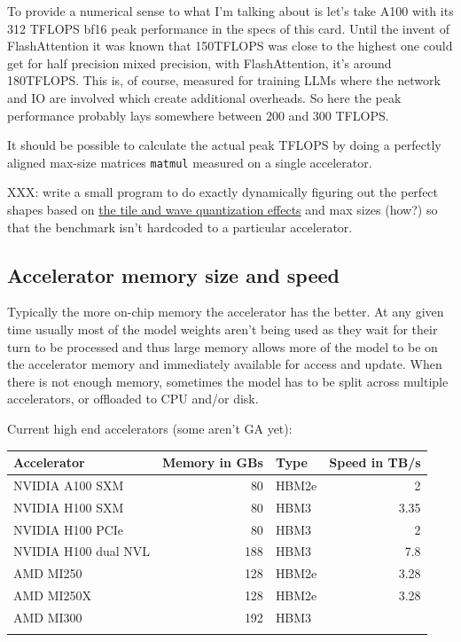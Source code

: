 \documentclass[
]{report}
\begin{document}
To provide a numerical sense to what I'm talking about is let's take
A100 with its 312 TFLOPS bf16 peak performance in the specs of this
card. Until the invent of FlashAttention it was known that 150TFLOPS was
close to the highest one could get for half precision mixed precision,
with FlashAttention, it's around 180TFLOPS. This is, of course, measured
for training LLMs where the network and IO are involved which create
additional overheads. So here the peak performance probably lays
somewhere between 200 and 300 TFLOPS.

It should be possible to calculate the actual peak TFLOPS by doing a
perfectly aligned max-size matrices \texttt{matmul} measured on a single
accelerator.

XXX: write a small program to do exactly dynamically figuring out the
perfect shapes based on
\href{https://docs.nvidia.com/deeplearning/performance/dl-performance-matrix-multiplication/index.html\#dim-quantization}{the
tile and wave quantization effects} and max sizes (how?) so that the
benchmark isn't hardcoded to a particular accelerator.

\subsection{Accelerator memory size and
speed}\label{accelerator-memory-size-and-speed}

Typically the more on-chip memory the accelerator has the better. At any
given time usually most of the model weights aren't being used as they
wait for their turn to be processed and thus large memory allows more of
the model to be on the accelerator memory and immediately available for
access and update. When there is not enough memory, sometimes the model
has to be split across multiple accelerators, or offloaded to CPU and/or
disk.

Current high end accelerators (some aren't GA yet):

\begin{longtable}[]{@{}lrlr@{}}
\toprule\noalign{}
Accelerator & Memory in GBs & Type & Speed in TB/s \\
\midrule\noalign{}
\endhead
\bottomrule\noalign{}
\endlastfoot
NVIDIA A100 SXM & 80 & HBM2e & 2 \\
NVIDIA H100 SXM & 80 & HBM3 & 3.35 \\
NVIDIA H100 PCIe & 80 & HBM3 & 2 \\
NVIDIA H100 dual NVL & 188 & HBM3 & 7.8 \\
AMD MI250 & 128 & HBM2e & 3.28 \\
AMD MI250X & 128 & HBM2e & 3.28 \\
AMD MI300 & 192 & HBM3 & \\
& & & \\
\end{longtable}
\end{document}
